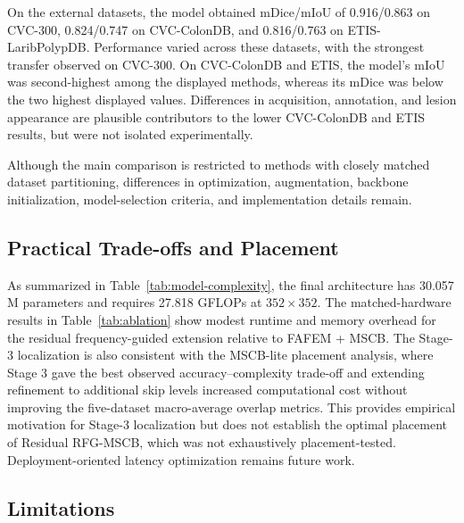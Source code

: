 On the external datasets, the model obtained mDice/mIoU of 0.916/0.863 on
CVC-300, 0.824/0.747 on CVC-ColonDB, and 0.816/0.763 on ETIS-LaribPolypDB.
Performance varied across these datasets, with the strongest transfer observed on
CVC-300. On CVC-ColonDB and ETIS, the model's mIoU was second-highest among the
displayed methods, whereas its mDice was below the two highest displayed values.
Differences in acquisition, annotation, and lesion appearance are plausible contributors
to the lower CVC-ColonDB and ETIS results, but were not isolated experimentally.

Although the main comparison is restricted to methods with closely matched dataset
partitioning, differences in optimization, augmentation, backbone initialization,
model-selection criteria, and implementation details remain.

\subsection{Practical Trade-offs and Placement}

As summarized in Table~\ref{tab:model-complexity}, the final architecture has
30.057 M parameters and requires 27.818 GFLOPs at $352\times352$. The matched-hardware
results in Table~\ref{tab:ablation} show modest runtime and memory overhead for the
residual frequency-guided extension relative to FAFEM + MSCB. The Stage-3 localization is also consistent
with the MSCB-lite placement analysis, where Stage 3 gave the best observed
accuracy--complexity trade-off and extending refinement to additional skip levels
increased computational cost without improving the five-dataset macro-average overlap
metrics. This provides empirical motivation for Stage-3 localization but does not
establish the optimal placement of Residual RFG-MSCB, which was not exhaustively
placement-tested. Deployment-oriented latency optimization remains future work.

\subsection{Limitations}

